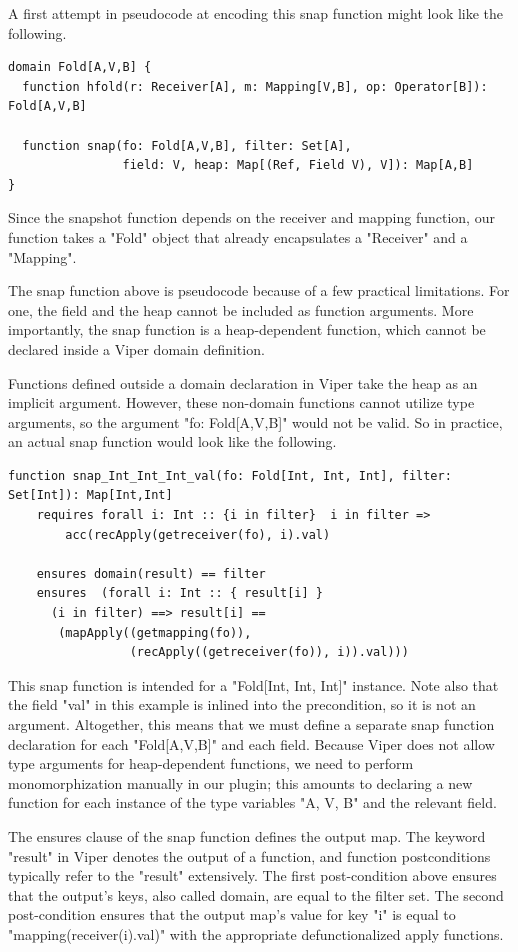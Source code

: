 \documentclass[msc,oneside]{ubcthesis}
\begin{document}
A first attempt in pseudocode at encoding this snap function might look like the following. 
\begin{lstlisting}
domain Fold[A,V,B] {
  function hfold(r: Receiver[A], m: Mapping[V,B], op: Operator[B]): Fold[A,V,B]

  function snap(fo: Fold[A,V,B], filter: Set[A], 
                field: V, heap: Map[(Ref, Field V), V]): Map[A,B]
}
\end{lstlisting}
Since the snapshot function depends on the receiver and mapping function, our function takes a "Fold" object that already encapsulates a "Receiver" and a "Mapping". 

The snap function above is pseudocode because of a few practical limitations. For one, the field and the heap cannot be included as function arguments. More importantly, the snap function is a heap-dependent function, which cannot be declared inside a Viper domain definition. 

Functions defined outside a domain declaration in Viper take the heap as an implicit argument. However, these non-domain functions cannot utilize type arguments, so the argument "fo: Fold[A,V,B]" would not be valid. So in practice, an actual snap function would look like the following.
\begin{lstlisting}
function snap_Int_Int_Int_val(fo: Fold[Int, Int, Int], filter: Set[Int]): Map[Int,Int]
    requires forall i: Int :: {i in filter}  i in filter => 
        acc(recApply(getreceiver(fo), i).val)

    ensures domain(result) == filter
    ensures  (forall i: Int :: { result[i] }
      (i in filter) ==> result[i] ==
       (mapApply((getmapping(fo)), 
                 (recApply((getreceiver(fo)), i)).val)))
\end{lstlisting}
This snap function is intended for a "Fold[Int, Int, Int]" instance. Note also that the field "val" in this example is inlined into the precondition, so it is not an argument. Altogether, this means that we must define a separate snap function declaration for each "Fold[A,V,B]" and each field. Because Viper does not allow type arguments for heap-dependent functions, we need to perform monomorphization manually in our plugin; this amounts to declaring a new function for each instance of the type variables "A, V, B" and the relevant field. 

The ensures clause of the snap function defines the output map. The keyword "result" in Viper denotes the output of a function, and function postconditions typically refer to the "result" extensively. The first post-condition above ensures that the output's keys, also called domain, are equal to the filter set. The second post-condition ensures that the output map's value for key "i" is equal to "mapping(receiver(i).val)" with the appropriate defunctionalized apply functions.
\end{document}
